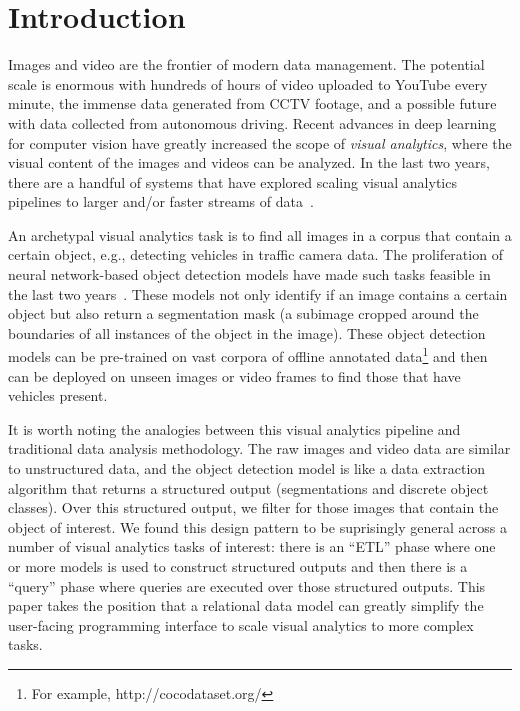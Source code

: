 \section{Introduction}\label{intro}\sloppy
Images and video are the frontier of modern data management.
The potential scale is enormous with hundreds of hours of video uploaded to YouTube every minute, the immense data generated from CCTV footage, and a possible future with data collected from autonomous driving. 
Recent advances in deep learning for computer vision have greatly increased the scope of \emph{visual analytics}, where the visual content of the images and videos can be analyzed.
In the last two years, there are a handful of systems that have explored scaling visual analytics pipelines to larger and/or faster streams of data~\cite{anderson2018predicate, kang2018blazeit,kang2017noscope, wu2018querying, sparks2017keystoneml}.

An archetypal visual analytics task is to find all images in a corpus that contain a certain object, e.g., detecting vehicles in traffic camera data.
The proliferation of neural network-based object detection models have made such tasks feasible in the last two years~\cite{he2017mask}.
These models not only identify if an image contains a certain object but also return a segmentation mask (a subimage cropped around the boundaries of all instances of the object in the image).
These object detection models can be pre-trained on vast corpora of offline annotated data\footnote{For example, http://cocodataset.org/} and then can be deployed on unseen images or video frames to find those that have vehicles present.

It is worth noting the analogies between this visual analytics pipeline and traditional data analysis methodology.
The raw images and video data are similar to unstructured data, and the object detection model is like a data extraction algorithm that returns a structured output (segmentations and discrete object classes).
Over this structured output, we filter for those images that contain the object of interest.
We found this design pattern to be suprisingly general across a number of visual analytics tasks of interest: there is an ``ETL'' phase where one or more models is used to construct structured outputs and then there is a ``query'' phase where queries are executed over those structured outputs.
This paper takes the position that a relational data model can greatly simplify the user-facing programming interface to scale visual analytics to more complex tasks.

